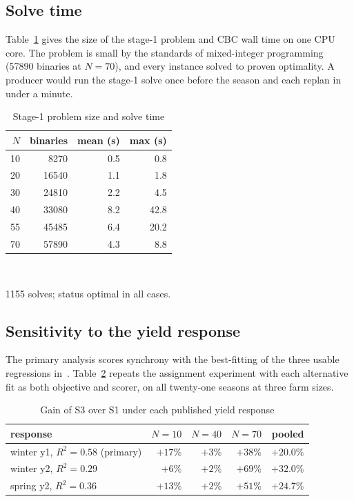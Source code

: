 \documentclass[10pt,twocolumn]{article}
\begin{document}
\subsection{Solve time}

Table~\ref{tab:solver} gives the size of the stage-1 problem and CBC
wall time on one CPU core. The problem is small by
the standards of mixed-integer programming
(57890 binaries at $N = 70$), and
every instance solved to proven optimality. A producer
would run the stage-1 solve once before the season and each replan
in under a minute.

\begin{table}[t]
\centering
\caption{Stage-1 problem size and solve time}
\label{tab:solver}
\footnotesize
\begin{tabular}{rrrr}
\hline
$N$ & binaries & mean (s) & max (s) \\
\hline
10 & 8270 & 0.5 & 0.8 \\
20 & 16540 & 1.1 & 1.8 \\
30 & 24810 & 2.2 & 4.5 \\
40 & 33080 & 8.2 & 42.8 \\
55 & 45485 & 6.4 & 20.2 \\
70 & 57890 & 4.3 & 8.8 \\
\hline
\end{tabular}
\\[2pt]
\footnotesize\raggedright 1155 solves; status optimal in all cases.
\end{table}

\subsection{Sensitivity to the yield response}

The primary analysis scores synchrony with the best-fitting of the
three usable regressions in~\cite{marahatta2025}. Table~\ref{tab:curves}
repeats the assignment experiment with each alternative fit as both
objective and scorer, on all twenty-one seasons at three farm sizes.

\begin{table}[t]
\centering
\caption{Gain of S3 over S1 under each published yield response}
\label{tab:curves}
\footnotesize
\setlength{\tabcolsep}{3pt}
\begin{tabular}{@{}lrrrr@{}}
\hline
response & $N=10$ & $N=40$ & $N=70$ & pooled \\
\hline
winter y1, $R^2=0.58$ (primary) & $+17$\% & $+3$\% & $+38$\% & $+20.0$\% \\
winter y2, $R^2=0.29$ & $+6$\% & $+2$\% & $+69$\% & $+32.0$\% \\
spring y2, $R^2=0.36$ & $+13$\% & $+2$\% & $+51$\% & $+24.7$\% \\
\hline
\end{tabular}
\end{table}
\end{document}
